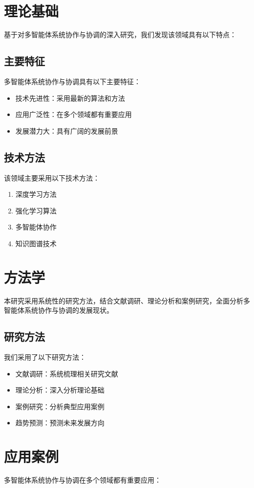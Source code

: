 \documentclass[12pt]{article}
\begin{document}
\section{理论基础}
基于对多智能体系统协作与协调的深入研究，我们发现该领域具有以下特点：

\subsection{主要特征}
多智能体系统协作与协调具有以下主要特征：
\begin{itemize}
    \item 技术先进性：采用最新的算法和方法
    \item 应用广泛性：在多个领域都有重要应用
    \item 发展潜力大：具有广阔的发展前景
\end{itemize}

\subsection{技术方法}
该领域主要采用以下技术方法：
\begin{enumerate}
    \item 深度学习方法
    \item 强化学习算法
    \item 多智能体协作
    \item 知识图谱技术
\end{enumerate}

\section{方法学}
本研究采用系统性的研究方法，结合文献调研、理论分析和案例研究，全面分析多智能体系统协作与协调的发展现状。

\subsection{研究方法}
我们采用了以下研究方法：
\begin{itemize}
    \item 文献调研：系统梳理相关研究文献
    \item 理论分析：深入分析理论基础
    \item 案例研究：分析典型应用案例
    \item 趋势预测：预测未来发展方向
\end{itemize}

\section{应用案例}
多智能体系统协作与协调在多个领域都有重要应用：
\end{document}
